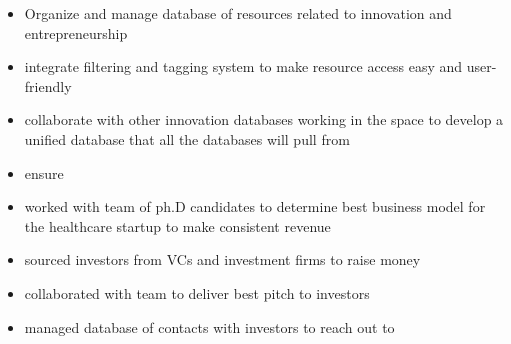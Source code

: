 \documentclass[10pt,a4paper,ragged2e]{altacv}
\begin{document}




\begin{fullwidth}
\makecvheader
\end{fullwidth}




\begin{itemize}
\item Organize and manage database of resources related to innovation and entrepreneurship
\smallskip
\item integrate filtering and tagging system to make resource access easy and user-friendly
\item collaborate with other innovation databases working in the space to develop a unified database that all the databases will pull from
\smallskip
\item ensure
\end{itemize}

\begin{itemize}
\item worked with team of ph.D candidates to determine best business model for the healthcare startup to make consistent revenue
\smallskip
\item sourced investors from VCs and investment firms to raise money
\smallskip
\item collaborated with team to deliver best pitch to investors
\smallskip
\item managed database of contacts with investors to reach out to
\end{itemize}



\smallskip
\end{document}
